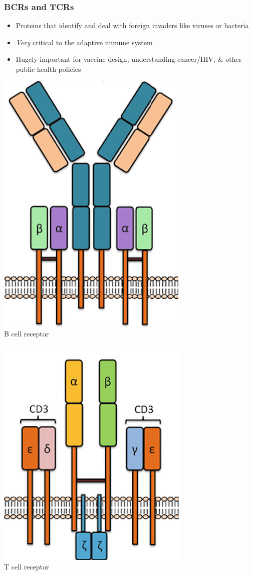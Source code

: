 \documentclass[mathserif,compress]{beamer}
\renewcommand\;{\,}
\begin{document}
\begin{frame}\frametitle{BCRs and TCRs}
\begin{minipage}{0.49\linewidth}
\begin{itemize}
\item
Proteins that identify and deal with foreign invaders like viruses or bacteria
\bigskip
\item
\emph{Very} critical to the adaptive immune system
\bigskip
\item
Hugely important for vaccine design, understanding cancer/HIV, \& other public health policies
\end{itemize}
\end{minipage}
\begin{minipage}{0.49\linewidth}
\begin{center}
\includegraphics[width=0.4\linewidth]{Images/BCR.png}
\\
\small
B cell receptor
\end{center}
\begin{center}
\includegraphics[width=0.4\linewidth]{Images/TCR.png}
\\
\small
T cell receptor
\end{center}
\end{minipage}
\end{frame}
\end{document}
